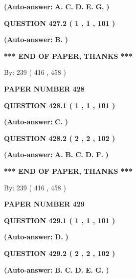 \documentclass[12pt]{article}
\begin{document}
 
{\textbf{(Auto-answer:}}
{\textbf{\large{
A.}}}
{\textbf{\large{
C.}}}
{\textbf{\large{
D.}}}
{\textbf{\large{
E.}}}
{\textbf{\large{
G.}}}
{\textbf{)}}
 
 
  
  
{\textbf{\large{QUESTION
427.2 
 ( 1 , 1 , 101 )
}}}
 
 
{\textbf{(Auto-answer:}}
{\textbf{\large{
B.}}}
{\textbf{)}}
 
 
   
   
\vspace{1.0in} 
{\textbf{\large{ *** END OF PAPER, THANKS *** }}} 
   
   
\hspace{1.0in} By: 
 239 ( 416 ,  458 )
   
   
   
   
\newpage 
\setcounter{page}{ 
   428001 } 
   
   
 {\textbf{ \Large{ PAPER NUMBER  428  }}}
   
   
  
  
{\textbf{\large{QUESTION
428.1 
 ( 1 , 1 , 101 )
}}}
 
 
{\textbf{(Auto-answer:}}
{\textbf{\large{
C.}}}
{\textbf{)}}
 
 
  
  
{\textbf{\large{QUESTION
428.2 
 ( 2 , 2 , 102 )
}}}
 
 
{\textbf{(Auto-answer:}}
{\textbf{\large{
A.}}}
{\textbf{\large{
B.}}}
{\textbf{\large{
C.}}}
{\textbf{\large{
D.}}}
{\textbf{\large{
F.}}}
{\textbf{)}}
 
 
   
   
\vspace{1.0in} 
{\textbf{\large{ *** END OF PAPER, THANKS *** }}} 
   
   
\hspace{1.0in} By: 
 239 ( 416 ,  458 )
   
   
   
   
\newpage 
\setcounter{page}{ 
   429001 } 
   
   
 {\textbf{ \Large{ PAPER NUMBER  429  }}}
   
   
  
  
{\textbf{\large{QUESTION
429.1 
 ( 1 , 1 , 101 )
}}}
 
 
{\textbf{(Auto-answer:}}
{\textbf{\large{
D.}}}
{\textbf{)}}
 
 
  
  
{\textbf{\large{QUESTION
429.2 
 ( 2 , 2 , 102 )
}}}
 
 
{\textbf{(Auto-answer:}}
{\textbf{\large{
B.}}}
{\textbf{\large{
C.}}}
{\textbf{\large{
D.}}}
{\textbf{\large{
E.}}}
{\textbf{\large{
G.}}}
{\textbf{)}}
 
\end{document}
